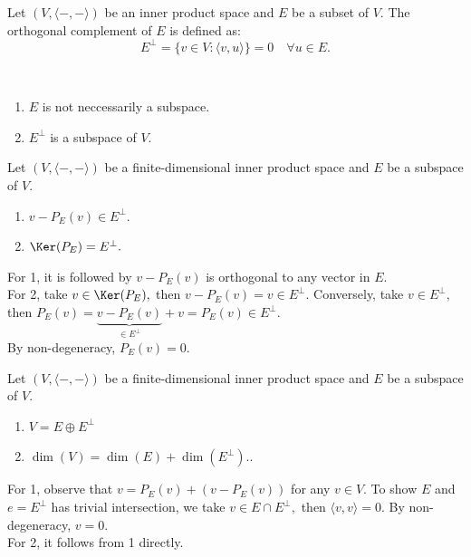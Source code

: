 \begin{definition}
    Let $(V,\langle-,-\rangle)$ be an inner product space and $E$ be a subset of $V$.
    The orthogonal complement of $E$ is defined as:
    \[E^\perp=\{v\in V: \langle v,u\rangle\}=0\quad\forall u\in E.\]
\end{definition}

\begin{remark}\
    \begin{enumerate}
        \item $E$ is not neccessarily a subspace.
        \item $E^\perp$ is a subspace of $V$.
    \end{enumerate}
\end{remark}

\begin{theorem}
 Let $(V,\langle-,-\rangle)$ be a finite-dimensional inner product space and $E$ be a subspace of $V$.
 \begin{enumerate}
    \item $v-P_E(v)\in E^\perp.$
    \item $\Ker(P_E)=E^\perp.$
\end{enumerate}
\end{theorem}

\begin{pfbox}
    For 1, it is followed by $v-P_E(v)$ is orthogonal to any vector in $E$.\\
    For 2, take $v\in \Ker(P_E),$ then $v-P_E(v)=v\in E^\perp.$
    Conversely, take $v\in E^\perp,$ then $P_E(v)=\underbrace{v-P_E(v)}_{\in E^\perp}+v=P_E(v)\in E^\perp.$\\
    By non-degeneracy, $P_E(v)=0.$
\end{pfbox}


\begin{theorem}
 Let $(V,\langle-,-\rangle)$ be a finite-dimensional inner product space and $E$ be a subspace of $V$.
 \begin{enumerate}
    \item $V=E\oplus E^\perp$
    \item $\dim(V)=\dim(E)+\dim(E^\perp)..$
\end{enumerate}
\end{theorem}

\begin{pfbox}
    For 1, observe that $v=P_E(v)+(v-P_E(v))$ for any $v\in V.$ To show $E$ and $e=E^\perp$ has trivial intersection, we take $v\in E\cap E^\perp,$ then $\langle v,v\rangle=0.$ By non-degeneracy, $v=0.$\\
    For 2, it follows from 1 directly.
\end{pfbox}



